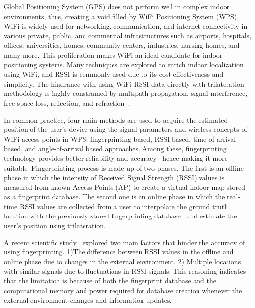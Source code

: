 \documentclass[a4paper,singleside,12pt]{report} %
\begin{document}
			Global Positioning System (GPS) does not perform well in complex indoor environments, thus, creating a void filled by WiFi Positioning System (WPS). 
			WiFi is widely used for networking, communication, and internet connectivity in various private, public, and commercial infrastructures such as airports, hospitals, offices, universities, homes, community centers, industries, nursing homes, and many more. 
			This proliferation makes WiFi an ideal candidate for indoor positioning systems. 
			Many techniques are explored to enrich indoor localization using WiFi, and RSSI is commonly used due to its cost-effectiveness and simplicity. 
			The hindrance with using WiFi RSSI data directly with trilateration methodology is highly constrained by multipath propagation, signal interference, free-space loss, reflection, and refraction~\cite{sadowski2018rssi}. 
			
			In common practice, four main methods are used to acquire the estimated position of the user's device using the signal parameters and wireless concepts of WiFi access points in WPS: fingerprinting based, RSSI based, time-of-arrival based, and angle-of-arrival based approaches. 
			Among these, fingerprinting technology provides better reliability and accuracy~\cite{jang2018indoor} hence making it more suitable. 
			Fingerprinting process is made up of two phases. The first is an offline phase in which the intensity of Received Signal Strength (RSSI) values is measured from known Access Points (AP) to create a virtual indoor map stored as a fingerprint database. 
			The second one is an online phase in which the real-time RSSI values are collected from a user to interpolate the ground truth location with the previously stored fingerprinting database~\cite{youssef2005horus} and estimate the user's position using trilateration. 
			
			A recent scientific study~\cite{liu2012push} explored two main factors that hinder the accuracy of using fingerprinting. 
			1)The difference between RSSI values in the offline and online phase due to changes in the external environment. 
			2) Multiple locations with similar signals due to fluctuations in RSSI signals.
			This reasoning indicates that the limitation is because of both the fingerprint database and the computational memory and power required for database creation whenever the external environment changes and information updates.
			
\end{document}
